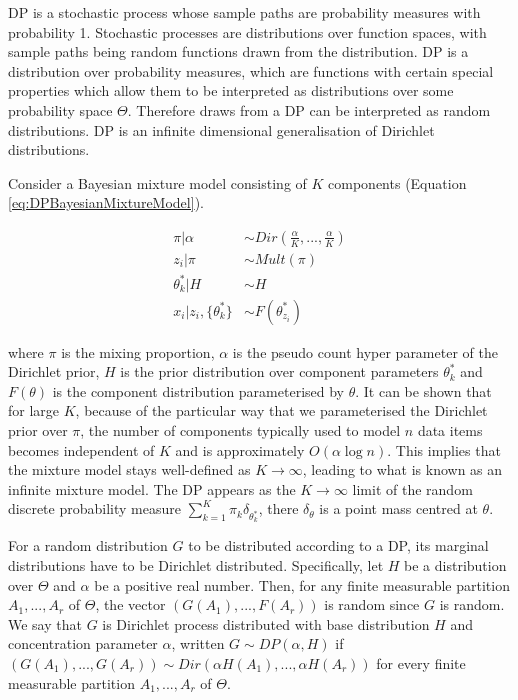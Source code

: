DP is a stochastic process whose sample paths are probability measures with probability 1. Stochastic processes are distributions over function spaces, with sample paths being random functions drawn from the distribution. DP is a distribution over probability measures, which are functions with certain special properties which allow them to be interpreted as distributions over some probability space $\Theta$. Therefore draws from a DP can be interpreted as random distributions. DP is an infinite dimensional generalisation of Dirichlet distributions.

Consider a Bayesian mixture model consisting of $K$ components (Equation \ref{eq:DPBayesianMixtureModel}).

\begin{subequations}
\label{eq:DPBayesianMixtureModel}
\begin{align}
\pi|\alpha&\sim Dir(\frac{\alpha}{K},...,\frac{\alpha}{K})
\\
z_{i}|\pi&\sim Mult(\pi)
\\
\theta_{k}^{*}|H&\sim H
\\
x_{i}|z_{i},\{\theta_{k}^{*}\}&\sim F(\theta_{z_{i}}^{*})
\end{align}
\end{subequations}

\noindent where $\pi$ is the mixing proportion, $\alpha$ is the pseudo count hyper parameter of the Dirichlet prior, $H$ is the prior distribution over component parameters $\theta_{k}^{*}$ and $F(\theta)$ is the component distribution parameterised by $\theta$. It can be shown that for large $K$, because of the particular way that we parameterised the Dirichlet prior over $\pi$, the number of components typically used to model $n$ data items becomes independent of $K$ and is approximately $O(\alpha\log n)$. This implies that the mixture model stays well-defined as $K\rightarrow \infty$, leading to what is known as an infinite mixture model. The DP appears as the $K\rightarrow\infty$ limit of the random discrete probability measure $\sum_{k=1}^{K}\pi_{k}\delta_{\theta_{k}^{*}}$, there $\delta_{\theta}$ is a point mass centred at $\theta$.

For a random distribution $G$ to be distributed according to a DP, its marginal distributions have to be Dirichlet distributed. Specifically, let $H$ be a distribution over $\Theta$ and $\alpha$ be a positive real number. Then, for any finite measurable partition $A_{1},...,A_{r}$ of $\Theta$, the vector $(G(A_{1}),...,F(A_{r}))$ is random since $G$ is random. We say that $G$ is Dirichlet process distributed with base distribution $H$ and concentration parameter $\alpha$, written $G\sim DP(\alpha,H)$ if $(G(A_{1}),...,G(A_{r}))\sim Dir(\alpha H(A_{1}),...,\alpha H(A_{r}))$ for every finite measurable partition $A_{1},...,A_{r}$ of $\Theta$.

